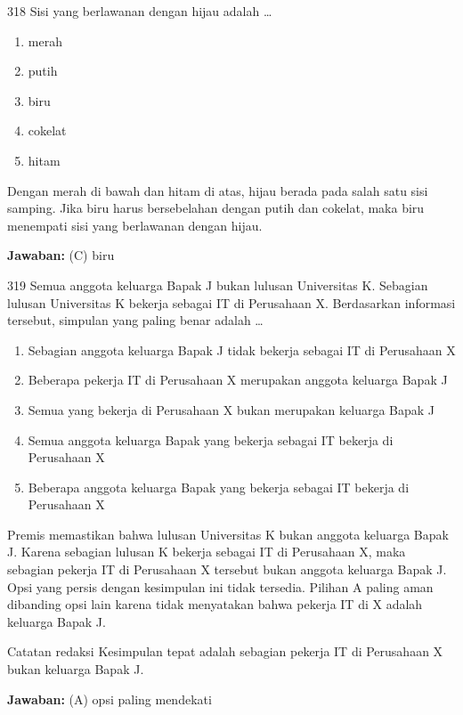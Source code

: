 \documentclass[11pt]{article}
\newenvironment{pil}{\begin{enumerate}[label=(\Alph*),leftmargin=*,itemsep=1pt,topsep=3pt]}{\end{enumerate}}
\newcommand{\jw}[1]{\par\smallskip\begin{jawbox}\textbf{Jawaban:} #1\end{jawbox}}
\begin{document}
\begin{soalbox}{3}{18}
Sisi yang berlawanan dengan hijau adalah \ldots
\begin{pil}\item merah \item putih \item biru \item cokelat \item hitam\end{pil}
\end{soalbox}
\begin{pembox}
Dengan merah di bawah dan hitam di atas, hijau berada pada salah satu sisi samping. Jika biru harus bersebelahan dengan putih dan cokelat, maka biru menempati sisi yang berlawanan dengan hijau.
\jw{(C) biru}
\end{pembox}

\begin{soalbox}{3}{19}
Semua anggota keluarga Bapak J bukan lulusan Universitas K. Sebagian lulusan Universitas K bekerja sebagai IT di Perusahaan X. Berdasarkan informasi tersebut, simpulan yang paling benar adalah \ldots
\begin{pil}\item Sebagian anggota keluarga Bapak J tidak bekerja sebagai IT di Perusahaan X \item Beberapa pekerja IT di Perusahaan X merupakan anggota keluarga Bapak J \item Semua yang bekerja di Perusahaan X bukan merupakan keluarga Bapak J \item Semua anggota keluarga Bapak yang bekerja sebagai IT bekerja di Perusahaan X \item Beberapa anggota keluarga Bapak yang bekerja sebagai IT bekerja di Perusahaan X\end{pil}
\end{soalbox}
\begin{pembox}
Premis memastikan bahwa lulusan Universitas K bukan anggota keluarga Bapak J. Karena sebagian lulusan K bekerja sebagai IT di Perusahaan X, maka sebagian pekerja IT di Perusahaan X tersebut bukan anggota keluarga Bapak J. Opsi yang persis dengan kesimpulan ini tidak tersedia. Pilihan A paling aman dibanding opsi lain karena tidak menyatakan bahwa pekerja IT di X adalah keluarga Bapak J.
\begin{infobox}{Catatan redaksi}
Kesimpulan tepat adalah sebagian pekerja IT di Perusahaan X bukan keluarga Bapak J.
\end{infobox}
\jw{(A) opsi paling mendekati}
\end{pembox}
\end{document}
